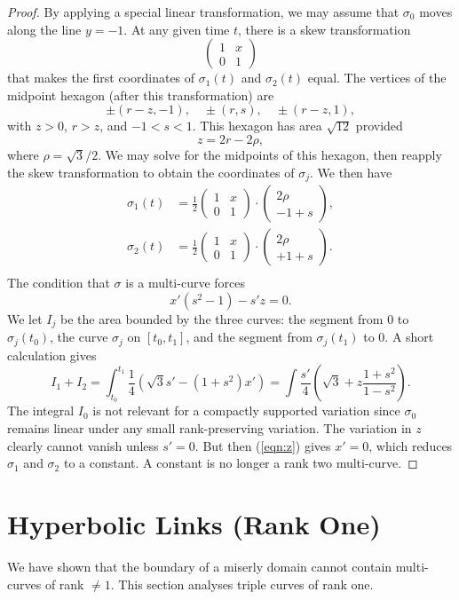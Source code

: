 \documentclass[11pt]{amsart}
\begin{document}
\begin{proof}  By applying a special linear transformation, we may assume that $\sigma_0$ moves along the line $y=-1$.  At any given time $t$, there is a skew transformation
\def\xm{\left(\begin{matrix} 1& x\\0&1\end{matrix}\right)}
\def\vc#1#2{\left(\begin{matrix}#1\\#2\end{matrix}\right)}
$$
\xm
$$
that makes the first coordinates of  $\sigma_1(t)$ and $\sigma_2(t)$ equal.   The vertices of the midpoint hexagon (after this transformation) are
$$
\pm (r-z,-1), \quad \pm (r,s),\quad \pm (r-z,1),
$$
with $z>0$, $r>z$, and $-1<s<1$.  This hexagon has area $\sqrt{12}$ provided
$$
z = 2 r - 2 \rho,
$$
where  $\rho = \sqrt3/2$.
We may solve for the midpoints of this hexagon, then reapply the skew transformation to obtain the coordinates of $\sigma_j$.
We then have
$$
\begin{array}{lll}
\sigma_1(t) &= \frac12\xm\cdot\vc {2\rho}{-1+s},\\
\sigma_2(t) &= \frac12\xm\cdot\vc {2\rho}{+1+s}.\\
\end{array}
$$
The condition that $\sigma$ is a multi-curve forces
\begin{equation}\label{eqn:z}
x' (s^2 - 1) - s' z = 0.
\end{equation}
We let $I_j$ be the area bounded by the three curves: the segment from $0$ to $\sigma_j(t_0)$, the curve $\sigma_j$ on $[t_0,t_1]$, and the segment from $\sigma_j(t_1)$ to $0$.  A short calculation gives
$$
I_1 + I_2 = \int_{t_0}^{t_1} \frac{1}4 (\sqrt{3} s' - (1+s^2) x') =
\int \frac{s'} 4 \left(\sqrt{3} + z \frac{1+s^2}{1-s^2}\right).
$$
The integral $I_0$ is not relevant for a compactly supported variation
since $\sigma_0$ remains linear under any small rank-preserving variation.  The variation in $z$ clearly cannot vanish unless $s' = 0$.  But
then (\ref{eqn:z}) gives $x'=0$, which reduces $\sigma_1$ and $\sigma_2$
to a constant.   A constant is no longer a rank two multi-curve.
\end{proof}

\section{Hyperbolic Links (Rank One)}

We have shown that the boundary of a miserly domain cannot
contain multi-curves of rank $\ne 1$.  This section analyses triple
curves of rank one.
\end{document}
